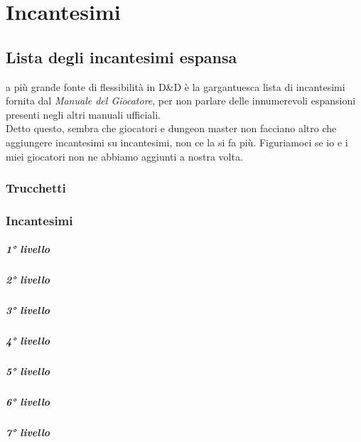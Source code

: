 \chapter{Incantesimi}

\section{Lista degli incantesimi espansa}

a più grande fonte di flessibilità in D\&D è la gargantuesca lista di incantesimi fornita dal \textit{Manuale del Giocatore}, per non parlare delle innumerevoli espansioni presenti negli altri manuali ufficiali. \\ Detto questo, sembra che giocatori e dungeon master non facciano altro che aggiungere incantesimi su incantesimi, non ce la si fa più. Figuriamoci se io e i miei giocatori non ne abbiamo aggiunti a nostra volta.

\subsection{Trucchetti}

\subsection{Incantesimi}
\paragraph{1° livello}
\paragraph{2° livello}
\paragraph{3° livello}
\paragraph{4° livello}
\paragraph{5° livello}
\paragraph{6° livello}
\paragraph{7° livello}
